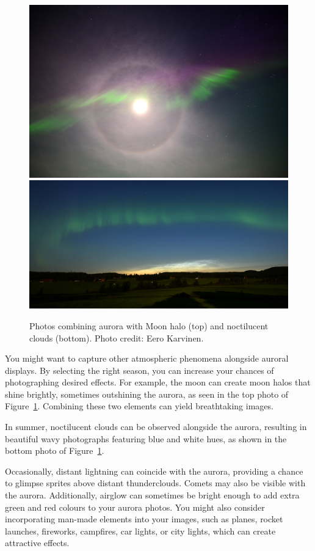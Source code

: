 \documentclass{article}
\begin{document}
\begin{figure}[h!]
\begin{centering}
  \includegraphics[width=0.9\linewidth]{Fig12a_AuroraMoonHalo_Eero_Karvinen.jpg}
  \includegraphics[width=0.9\linewidth]{Fig12b_AuroraNLC_Eero_Karvinen.jpg}
  \caption{Photos combining aurora with Moon halo (top) and noctilucent clouds (bottom). Photo credit: Eero Karvinen.}
  \label{AuroraHaloNLC}
  \end{centering}
\end{figure}

You might want to capture other atmospheric phenomena alongside auroral displays. By selecting the right season, you can increase your chances of photographing desired effects. For example, the moon can create moon halos that shine brightly, sometimes outshining the aurora, as seen in the top photo of Figure~\ref{AuroraHaloNLC}. Combining these two elements can yield breathtaking images.

In summer, noctilucent clouds can be observed alongside the aurora, resulting in beautiful wavy photographs featuring blue and white hues, as shown in the bottom photo of Figure~\ref{AuroraHaloNLC}.

Occasionally, distant lightning can coincide with the aurora, providing a chance to glimpse sprites above distant thunderclouds. Comets may also be visible with the aurora. Additionally, airglow can sometimes be bright enough to add extra green and red colours to your aurora photos. You might also consider incorporating man-made elements into your images, such as planes, rocket launches, fireworks, campfires, car lights, or city lights, which can create attractive effects.
\end{document}
